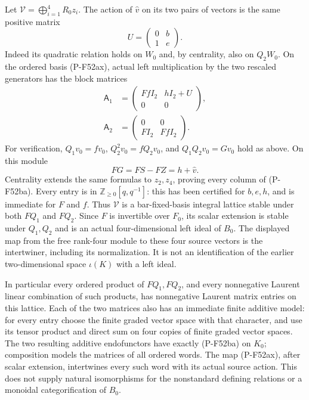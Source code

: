 Let $\mathcal V=\bigoplus_{i=1}^4R_0z_i$.
The action of $\widehat v$ on its two pairs of vectors is
the same positive matrix
\[
             U=\begin{pmatrix}0&b\\1&e\end{pmatrix}.
                                                               \tag{P-F52az}
\]
Indeed its quadratic relation holds on $W_0$ and, by
centrality, also on $Q_2W_0$.
On the ordered basis (P-F52ax), actual left multiplication
by the two rescaled generators has the block matrices
\[
 \begin{split}
    \mathsf A_1&=
       \begin{pmatrix}FfI_2&hI_2+U\\0&0\end{pmatrix},\\
    \mathsf A_2&=
       \begin{pmatrix}0&0\\FI_2&FfI_2\end{pmatrix}.
 \end{split}                                                    \tag{P-F52ba}
\]
For verification, $Q_1v_0=fv_0$, $Q_2^2v_0=fQ_2v_0$,
and $Q_1Q_2v_0=Gv_0$ hold as above.
On this module
\[
                 FG=FS-FZ=h+\widehat v.
                                                               \tag{P-F52bb}
\]
Centrality extends the same formulas to $z_2,z_4$,
proving every column of (P-F52ba).
Every entry is in $\mathbb Z_{\ge0}[q,q^{-1}]$:
this has been certified for $b,e,h$, and is immediate
for $F$ and $f$. Thus $\mathcal V$ is a bar-fixed-basis
integral lattice stable under both $FQ_1$ and $FQ_2$.
Since $F$ is invertible over $F_0$, its scalar extension
is stable under $Q_1,Q_2$ and is an actual four-dimensional
left ideal of $B_0$. The displayed map from the free
rank-four module to these four source vectors is the
intertwiner, including its normalization. It is not an
identification of the earlier two-dimensional space
$\iota(K)$ with a left ideal.

In particular every ordered product of $FQ_1,FQ_2$, and
every nonnegative Laurent linear combination of such
products, has nonnegative Laurent matrix entries on this
lattice. Each of the two matrices also has an immediate
finite additive model: for every entry choose the finite
graded vector space with that character, and use its
tensor product and direct sum on four copies of finite
graded vector spaces. The two resulting additive
endofunctors have exactly (P-F52ba) on $K_0$; composition
models the matrices of all ordered words. The map
(P-F52ax), after scalar extension, intertwines every such
word with its actual source action. This does not supply
natural isomorphisms for the nonstandard defining
relations or a monoidal categorification of $B_0$.

